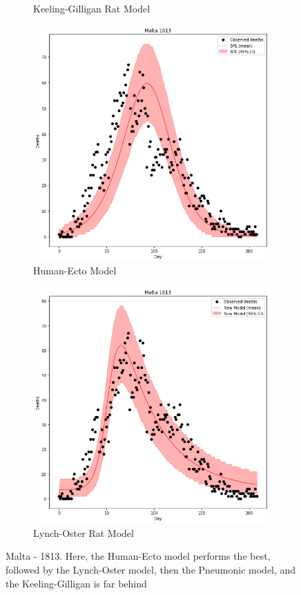\documentclass [letterpaper, 12pt] {article}
\begin{document}
\begin{figure}[H]
\begin{subfigure}{0.48\textwidth}
	\caption{Keeling-Gilligan Rat Model}
	\end{subfigure}
	\begin{subfigure}{0.48\textwidth}
	\includegraphics[width=\linewidth]{hum_ecto_malta.png}
	\caption{Human-Ecto Model}
	\end{subfigure}\hspace{\fill}
	\begin{subfigure}{0.48\textwidth}
	\includegraphics[width=\linewidth]{rats2_lynch_oster_malta.png}
	\caption{Lynch-Oster Rat Model}
	\end{subfigure}
	\caption{Malta - 1813. Here, the Human-Ecto model performs the best, followed by the Lynch-Oster model, then the Pneumonic model, and the Keeling-Gilligan is far behind}
\end{figure}
\end{document}
